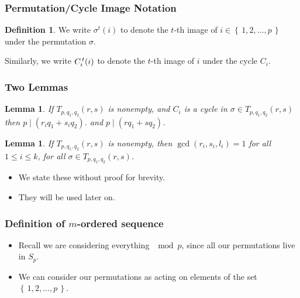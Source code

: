 \documentclass{beamer}
\theoremstyle{plain}
\newtheorem{lem}[theorem]{Lemma}
\theoremstyle{definition}
\newtheorem{Def}[theorem]{Definition}
\theoremstyle{remark}
\renewcommand{\leq}{\leqslant}			%
\renewcommand{\'}{\hspace{0.5mm}'}		%
\renewcommand{\Set}[1]{\left\{\,#1\,\right\}}	%
\begin{document}

\begin{frame}
\frametitle{Permutation/Cycle Image Notation}

	\begin{Def}
		We write
		$\sigma^t(i)$
		to denote the $t$-th image of 
		$i \in \Set{1,2,\hdots, p}$ under
		the permutation $\sigma$. 
		
		Similarly, we write
			$C_i^{\hspace{0.5mm}t}(i)$
		to denote the $t$-th image of $i$
		under the cycle $C_i$. 
	\end{Def}

\end{frame}


\begin{frame}
\frametitle{Two Lemmas}

	\begin{lem}
		If $T_{p,q_1,q_2}(r,s)$ is nonempty, 
		and $C_i$ is a cycle in $\sigma \in T_{p,q_1,q_2}(r,s)$
		then $p \mid (r_iq_1 + s_iq_2)$. 
		and $p \mid (rq_1 + sq_2)$. 
	\end{lem}
	
	\begin{lem}
		If $T_{p,q_1,q_2}(r,s)$ is nonempty, 
		then $\gcd(r_i,s_i,l_i) = 1$
		for all $1 \leq i \leq k$, for all
		$\sigma \in T_{p,q_1,q_2}(r,s)$. 
	\end{lem}
	
	\begin{itemize}
		\item We state these without proof for brevity. 
		\item They will be used later on. 
	\end{itemize}

\end{frame}


\begin{frame}
\frametitle{Definition of $m$-ordered sequence}
	\begin{itemize}
		\item Recall we are considering everything $\mod p$, 
	since all our permutations live in $S_p$. 
		\item We can consider our permutations
		as acting on elements
		of the set $\Set{1,2,\hdots, p}$. 
	\end{itemize}
	

\end{frame}
\end{document}

